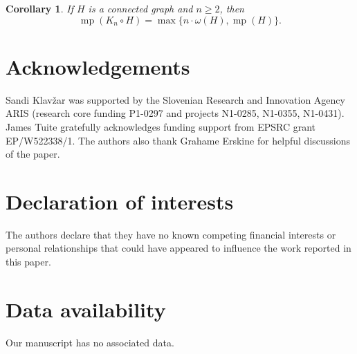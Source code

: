 \documentclass[12pt]{article}
\newtheorem{corollary}[theorem]{Corollary}
\DeclareMathOperator {\mono} {mp}
\begin{document}
\begin{corollary}
\label{corollary:3.7}
If $H$ is a connected graph and $n\ge 2$, then \[ \mono (K_n\circ H)=\max \{ n\cdot \omega(H),\mono (H)\} .\]
\end{corollary}


\section*{Acknowledgements}

Sandi Klav\v zar was supported by the Slovenian Research and Innovation Agency ARIS (research core funding P1-0297 and projects  N1-0285, N1-0355, N1-0431). James Tuite gratefully acknowledges funding support from EPSRC grant EP/W522338/1. The authors also thank Grahame Erskine for helpful discussions of the paper.

\section*{Declaration of interests}

The authors declare that they have no known competing financial interests or personal relationships that could have appeared to influence the work reported in this paper.

\section*{Data availability}

Our manuscript has no associated data.
\end{document}
